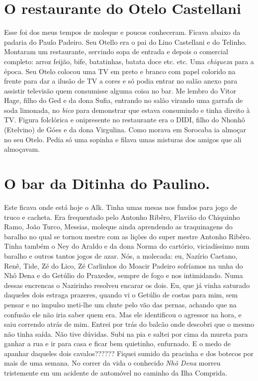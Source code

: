 \documentclass[12pt,brazil,]{book}
\begin{document}
\section{O restaurante do Otelo
Castellani}\label{o-restaurante-do-otelo-castellani}

Esse foi dos meus tempos de moleque e poucos conheceram. Ficava abaixo
da padaria do Paulo Padeiro. Seu Otello era o pai do Lino Castellani e
do Telinho. Montaram um restaurante, servindo sopa de entrada e depois o
comercial completo: arroz feijão, bife, batatinhas, batata doce etc.
etc. Uma \emph{chiqueza} para a época. Seu Otelo colocou uma TV em preto
e branco com papel colorido na frente para dar a ilusão de TV a cores e
só podia entrar no salão anexo para assistir televisão quem consumisse
alguma coisa no bar. Me lembro do Vitor Hage, filho do Ged e da dona
Sufia, entrando no salão virando uma garrafa de soda limonada, no
\emph{bico} para demonstrar que estava consumindo e tinha direito à TV.
Figura folclórica e onipresente no restaurante era o DIDI, filho do
Nhonhô (Etelvino) de Góes e da dona Virgulina. Como morava em Sorocaba
ia almoçar no seu Otelo. Pedia só uma sopinha e filava umas misturas dos
amigos que ali almoçavam.

\section{O bar da Ditinha do
Paulino.}\label{o-bar-da-ditinha-do-paulino.}

Este ficava onde está hoje o Alk. Tinha umas mesas nos fundos para jogo
de truco e cacheta. Era frequentado pelo Antonho Ribêro, Flavião do
Chiquinho Ramo, João Turco, Messias, moleque ainda aprendendo as
traquinagens do baralho no qual se tornou mestre com as lições do super
mestre Antonho Ribêro. Tinha também o Ney do Araldo e da dona Norma do
cartório, viciadíssimo num baralho e outros tantos jogos de azar. Nós, a
molecada: eu, Nazírio Caetano, Renê, Tide, Zé do Lico, Zé Carlinhos do
Moacir Padeiro sofríamos na unha do Nhô Dena e do Getúlio do Praxedes,
sempre de fogo e nos intimidando. Numa dessas encrencas o Nazirinho
resolveu encarar os dois. Eu, que já vinha saturado daqueles dois
estraga prazeres, quando vi o Getúlio de costas para mim, sem pensar e
no impulso meti-lhe um chute pelo vão das pernas, achando que na
confusão ele não iria saber quem era. Mas ele identificou o agressor na
hora, e saiu correndo atrás de mim. Entrei por trás do balcão onde
descobri que o mesmo não tinha saída. Não tive dúvidas. Subi na pia e
saltei por cima da mureta para ganhar a rua e ir para casa e ficar bem
quietinho, enfurnado. E o medo de apanhar daqueles dois cavalos??????
Fiquei sumido da pracinha e dos botecos por mais de uma semana. No
correr da vida o conhecido \emph{Nhô Dena} morreu tristemente em um
acidente de automóvel no caminho da Ilha Comprida.
\end{document}
